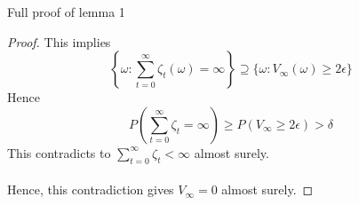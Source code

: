 \documentclass[aspectratio=169]{beamer} %
\begin{document}
\begin{frame}{Full proof of lemma 1}
\begin{proof}
    This implies 
$$
\left\{\omega: \sum_{t=0}^\infty \zeta_t(\omega)=\infty\right\}\supseteq \{\omega: V_\infty(\omega)\ge 2\epsilon\}
$$
Hence
$$
P\left(\sum_{t=0}^\infty \zeta_t =  \infty\right) \ge P\left(V_\infty \ge 2\epsilon\right)>\delta
$$
This contradicts to $\sum_{t=0}^\infty \zeta_t<\infty$ almost surely.\\
\\
Hence, this contradiction gives $V_\infty =0$ almost surely.
\end{proof}
    
\end{frame}
\end{document}
